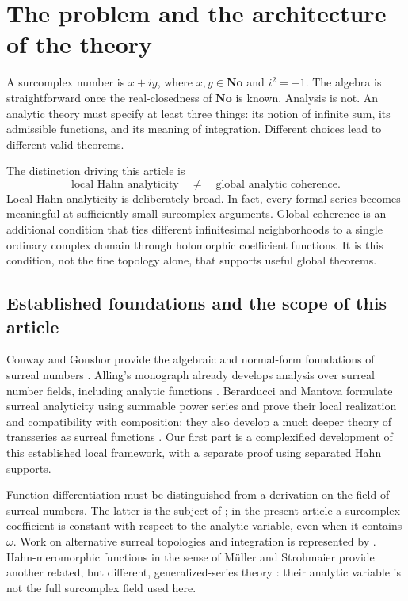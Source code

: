 \documentclass[11pt,a4paper]{article}
\theoremstyle{definition}\newtheorem{definition}[theorem]{Definition}
\theoremstyle{remark}\newtheorem{remark}[theorem]{Remark}
\newcommand{\No}{\mathbf{No}}
\numberwithin{equation}{section}
\begin{document}
\section{The problem and the architecture of the theory}

A surcomplex number is $x+iy$, where $x,y\in\No$ and $i^2=-1$. The algebra is straightforward once the real-closedness of $\No$ is known. Analysis is not. An analytic theory must specify at least three things: its notion of infinite sum, its admissible functions, and its meaning of integration. Different choices lead to different valid theorems.

The distinction driving this article is
\[
\boxed{\text{local Hahn analyticity}\quad\ne\quad\text{global analytic coherence}.}
\]
Local Hahn analyticity is deliberately broad. In fact, every formal series becomes meaningful at sufficiently small surcomplex arguments. Global coherence is an additional condition that ties different infinitesimal neighborhoods to a single ordinary complex domain through holomorphic coefficient functions. It is this condition, not the fine topology alone, that supports useful global theorems.

\subsection{Established foundations and the scope of this article}
Conway and Gonshor provide the algebraic and normal-form foundations of surreal numbers \cite{Conway,Gonshor}. Alling's monograph already develops analysis over surreal number fields, including analytic functions \cite{Alling}. Berarducci and Mantova formulate surreal analyticity using summable power series and prove their local realization and compatibility with composition; they also develop a much deeper theory of transseries as surreal functions \cite{BMgerms}. Our first part is a complexified development of this established local framework, with a separate proof using separated Hahn supports.

Function differentiation must be distinguished from a derivation on the field of surreal numbers. The latter is the subject of \cite{BMderiv}; in the present article a surcomplex coefficient is constant with respect to the analytic variable, even when it contains $\omega$. Work on alternative surreal topologies and integration is represented by \cite{RSS,CostinEhrlich}. Hahn-meromorphic functions in the sense of M\"uller and Strohmaier provide another related, but different, generalized-series theory \cite{MS}: their analytic variable is not the full surcomplex field used here.
\end{document}
